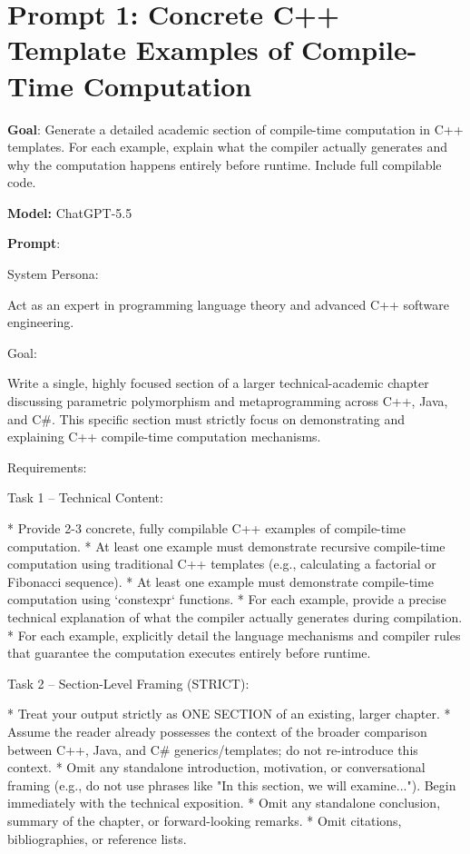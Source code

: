 \documentclass[11pt]{report}
\begin{document}
\section{Prompt 1: Concrete C++ Template Examples of Compile-Time Computation}

\noindent\textbf{Goal}: Generate a detailed academic section of compile-time computation in C++ templates. For each example, explain what the compiler actually generates and why the computation happens entirely before runtime. Include full compilable code.

\noindent\textbf{Model:} ChatGPT-5.5

\noindent\textbf{Prompt}:
\begin{PromptVerbatim}
System Persona:

Act as an expert in programming language theory and advanced C++ software engineering.

Goal:

Write a single, highly focused section of a larger technical-academic chapter discussing parametric polymorphism and metaprogramming across C++, Java, and C\#. This specific section must strictly focus on demonstrating and explaining C++ compile-time computation mechanisms.

Requirements:

Task 1 -- Technical Content:

* Provide 2-3 concrete, fully compilable C++ examples of compile-time computation.
* At least one example must demonstrate recursive compile-time computation using traditional C++ templates (e.g., calculating a factorial or Fibonacci sequence).
* At least one example must demonstrate compile-time computation using `constexpr` functions.
* For each example, provide a precise technical explanation of what the compiler actually generates during compilation.
* For each example, explicitly detail the language mechanisms and compiler rules that guarantee the computation executes entirely before runtime.

Task 2 -- Section-Level Framing (STRICT):

* Treat your output strictly as ONE SECTION of an existing, larger chapter.
* Assume the reader already possesses the context of the broader comparison between C++, Java, and C\# generics/templates; do not re-introduce this context.
* Omit any standalone introduction, motivation, or conversational framing (e.g., do not use phrases like "In this section, we will examine..."). Begin immediately with the technical exposition.
* Omit any standalone conclusion, summary of the chapter, or forward-looking remarks.
* Omit citations, bibliographies, or reference lists.


\end{PromptVerbatim}
\end{document}
